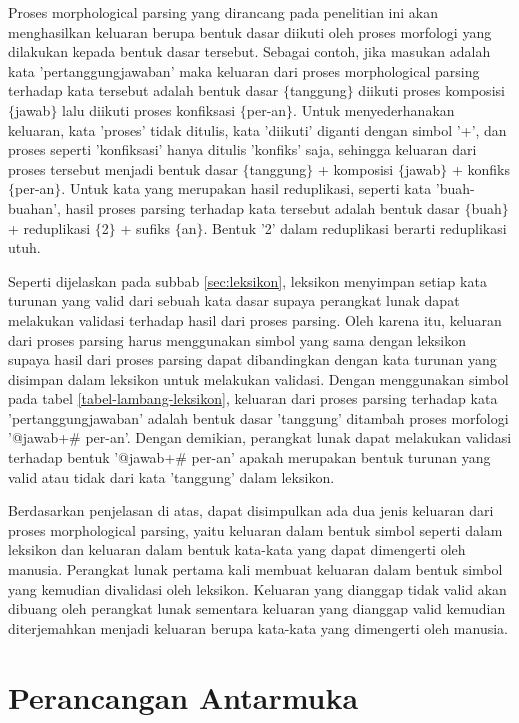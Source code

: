 Proses morphological parsing yang dirancang pada penelitian ini akan menghasilkan keluaran berupa bentuk dasar diikuti oleh proses morfologi yang dilakukan kepada bentuk dasar tersebut. Sebagai contoh, jika masukan adalah kata 'pertanggungjawaban' maka keluaran dari proses morphological parsing terhadap kata tersebut adalah bentuk dasar $\lbrace$tanggung$\rbrace$ diikuti proses komposisi $\lbrace$jawab$\rbrace$ lalu diikuti proses konfiksasi $\lbrace$per-an$\rbrace$. Untuk menyederhanakan keluaran, kata 'proses' tidak ditulis, kata 'diikuti' diganti dengan simbol '+', dan proses seperti 'konfiksasi' hanya ditulis 'konfiks' saja, sehingga keluaran dari proses tersebut menjadi bentuk dasar $\lbrace$tanggung$\rbrace$ + komposisi $\lbrace$jawab$\rbrace$ + konfiks $\lbrace$per-an$\rbrace$. Untuk kata yang merupakan hasil reduplikasi, seperti kata 'buah-buahan', hasil proses parsing terhadap kata tersebut adalah bentuk dasar $\lbrace$buah$\rbrace$ + reduplikasi $\lbrace$2$\rbrace$ + sufiks $\lbrace$an$\rbrace$. Bentuk '2' dalam reduplikasi berarti reduplikasi utuh.

Seperti dijelaskan pada subbab \ref{sec:leksikon}, leksikon menyimpan setiap kata turunan yang valid dari sebuah kata dasar supaya perangkat lunak dapat melakukan validasi terhadap hasil dari proses parsing. Oleh karena itu, keluaran dari proses parsing harus menggunakan simbol yang sama dengan leksikon supaya hasil dari proses parsing dapat dibandingkan dengan kata turunan yang disimpan dalam leksikon untuk melakukan validasi. Dengan menggunakan simbol pada tabel \ref{tabel-lambang-leksikon}, keluaran dari proses parsing terhadap kata 'pertanggungjawaban' adalah bentuk dasar 'tanggung' ditambah proses morfologi '@jawab+\# per-an'. Dengan demikian, perangkat lunak dapat melakukan validasi terhadap bentuk '@jawab+\# per-an' apakah merupakan bentuk turunan yang valid atau tidak dari kata 'tanggung' dalam leksikon.

Berdasarkan penjelasan di atas, dapat disimpulkan ada dua jenis keluaran dari proses morphological parsing, yaitu keluaran dalam bentuk simbol seperti dalam leksikon dan keluaran dalam bentuk kata-kata yang dapat dimengerti oleh manusia. Perangkat lunak pertama kali membuat keluaran dalam bentuk simbol yang kemudian divalidasi oleh leksikon. Keluaran yang dianggap tidak valid akan dibuang oleh perangkat lunak sementara keluaran yang dianggap valid kemudian diterjemahkan menjadi keluaran berupa kata-kata yang dimengerti oleh manusia.

\section{Perancangan Antarmuka}
\label{sec:perancanganAntarmuka}

